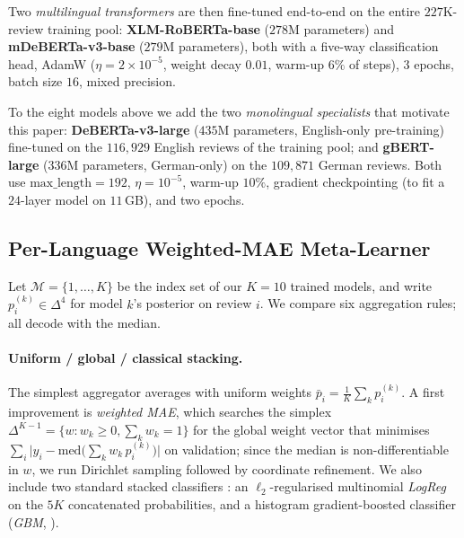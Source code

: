 \documentclass{article}
\theoremstyle{plain}
\begin{document}
Two \emph{multilingual transformers} are then fine-tuned end-to-end on
the entire $227$K-review training pool: \textbf{XLM-RoBERTa-base}
\cite{conneau2020xlmr} ($278$M parameters) and
\textbf{mDeBERTa-v3-base} \cite{he2023debertav3} ($279$M parameters),
both with a five-way classification head, AdamW
\cite{loshchilov2019adamw} ($\eta{=}2\!\times\!10^{-5}$, weight decay
$0.01$, warm-up $6\%$ of steps), $3$ epochs, batch size $16$, mixed
precision.

To the eight models above we add the two \emph{monolingual specialists}
that motivate this paper: \textbf{DeBERTa-v3-large}
\cite{he2023debertav3} ($435$M parameters, English-only pre-training)
fine-tuned on the $116{,}929$ English reviews of the training pool;
and \textbf{gBERT-large} \cite{chan2020gbert} ($336$M parameters,
German-only) on the $109{,}871$ German reviews. Both use
$\text{max\_length}{=}192$, $\eta{=}10^{-5}$, warm-up $10\%$, gradient
checkpointing (to fit a $24$-layer model on $11$\,GB), and two epochs.

\subsection{Per-Language Weighted-MAE Meta-Learner}
\label{sec:meta}

Let $\mathcal M=\{1,\dots,K\}$ be the index set of our $K{=}10$ trained
models, and write $p^{(k)}_i\in\Delta^4$ for model $k$'s posterior on
review $i$. We compare six aggregation rules; all decode with the
median.

\paragraph{Uniform / global / classical stacking.}
The simplest aggregator averages with uniform weights
$\bar p_i=\tfrac{1}{K}\sum_k p^{(k)}_i$. A first improvement is
\emph{weighted MAE}, which searches the simplex
$\Delta^{K-1}=\{w:w_k\ge 0,\sum_k w_k=1\}$ for the global weight vector
that minimises
$\sum_i \bigl|y_i-\mathrm{med}\bigl(\sum_k w_k\, p^{(k)}_i\bigr)\bigr|$
on validation; since the median is non-differentiable in $w$, we run
Dirichlet sampling followed by coordinate refinement.
We also include two standard stacked classifiers
\cite{wolpert1992stacked}: an $\ell_2$-regularised multinomial
\emph{LogReg} on the $5K$ concatenated probabilities, and a histogram
gradient-boosted classifier (\emph{GBM}, \citealt{ke2017lightgbm}).
\end{document}
